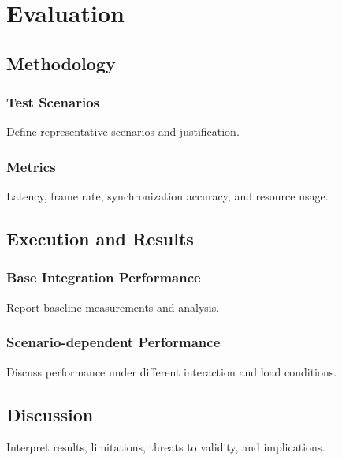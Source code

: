 \chapter{Evaluation} \label{chap:evaluation}

\section{Methodology}
\subsection{Test Scenarios}
Define representative scenarios and justification.

\subsection{Metrics}
Latency, frame rate, synchronization accuracy, and resource usage.

\section{Execution and Results}
\subsection{Base Integration Performance}
Report baseline measurements and analysis.

\subsection{Scenario-dependent Performance}
Discuss performance under different interaction and load conditions.

\section{Discussion}
Interpret results, limitations, threats to validity, and implications.
